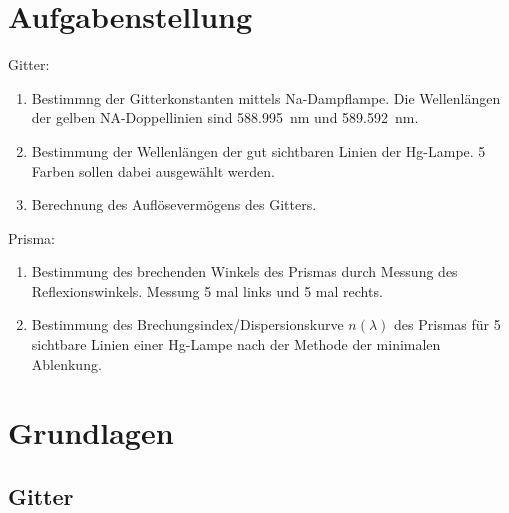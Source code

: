 \documentclass{article}
\begin{document}
\parindent0cm




\pagestyle{fancy}

\tableofcontents
\newpage

\section{Aufgabenstellung}

Gitter:
\begin{enumerate}
\item Bestimmng der Gitterkonstanten mittels Na-Dampflampe. Die Wellenlängen der gelben NA-Doppellinien sind 588.995~nm und 589.592~nm.

\item Bestimmung der Wellenlängen der gut sichtbaren Linien der Hg-Lampe. 5 Farben sollen dabei ausgewählt werden. 

\item Berechnung des Auflösevermögens des Gitters.%
\end{enumerate}


Prisma: 
\begin{enumerate}
\item Bestimmung des brechenden Winkels des Prismas durch Messung des Reflexionswinkels. Messung 5 mal links und 5 mal rechts. %
\item Bestimmung des Brechungsindex/Dispersionskurve $n(\lambda)$ des Prismas für 5 sichtbare Linien einer Hg-Lampe nach der Methode der minimalen Ablenkung. %
\end{enumerate}


\section{Grundlagen}

\subsection{Gitter}
\end{document}
